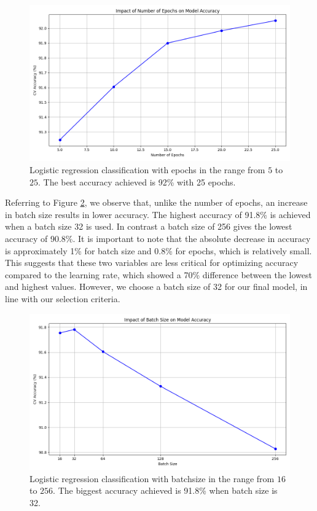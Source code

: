 \begin{figure}[H]
    \centering
    \includegraphics[width=\textwidth]{results/logreg/number_of_epochs_study.png}
    \caption{Logistic regression classification with epochs in the range from $5$ to $25$. The best accuracy achieved is 92\% with 25 epochs.}
    \label{fig:LogRegEpochs}
\end{figure}

\newpage
Referring to Figure \ref{fig:LogRegBatchsize}, we observe that, unlike the number of epochs, an increase in batch size results in lower accuracy. The highest accuracy of 91.8\% is achieved when a batch size 32 is used. In contrast a batch size of 256 gives the lowest accuracy of 90.8\%. It is important to note that the absolute decrease in accuracy is approximately 1\% for batch size and 0.8\% for epochs, which is relatively small. This suggests that these two variables are less critical for optimizing accuracy compared to the learning rate, which showed a 70\% difference between the lowest and highest values. However, we choose a batch size of 32 for our final model, in line with our selection criteria.

\begin{figure}[H]
    \centering
    \includegraphics[width=\textwidth]{results/logreg/batch_size_study.png}
    \caption{Logistic regression classification with batchsize in the range from $16$ to $256$. The biggest accuracy achieved is 91.8\% when batch size is 32.}
    \label{fig:LogRegBatchsize}
\end{figure}

